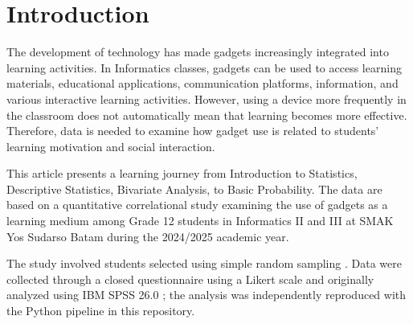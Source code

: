 \section{Introduction}

The development of technology has made gadgets increasingly integrated
into learning activities. In Informatics classes, gadgets can be used to
access learning materials, educational applications, communication
platforms, information, and various interactive learning activities.
However, using a device more frequently in the classroom does not
automatically mean that learning becomes more effective. Therefore, data
is needed to examine how gadget use is related to students' learning
motivation and social interaction.

This article presents a learning journey from Introduction to Statistics,
Descriptive Statistics, Bivariate Analysis, to Basic Probability. The data
are based on a quantitative correlational study examining the use of
gadgets as a learning medium among Grade 12 students in Informatics II and
III at SMAK Yos Sudarso Batam during the 2024/2025 academic year.

The study involved \resN{} students selected using simple random sampling
\parencite{sugiyono2017}. Data were collected through a closed
questionnaire using a Likert scale and originally analyzed using IBM
SPSS 26.0 \parencite{ibm2021}; the analysis was independently reproduced
with the Python pipeline in this repository.
